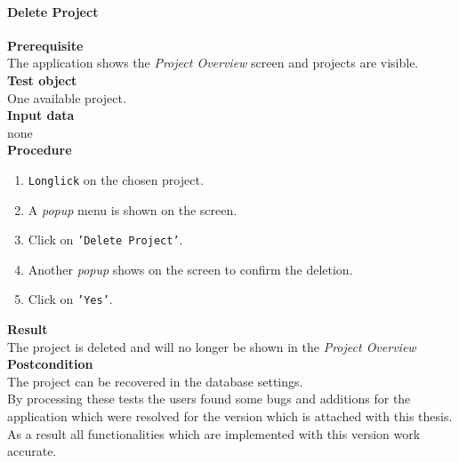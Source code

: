 \paragraph*{\textbf{Delete Project}}
\textbf{Prerequisite}\\
The application shows the \textit{Project Overview} screen and projects are visible.\\
\textbf{Test object}\\
One available project.\\
\textbf{Input data}\\
none\\
\textbf{Procedure}
\begin{enumerate}
	\item \texttt{Longlick} on the chosen project.
	\item A \textit{popup} menu is shown on the screen.
	\item Click on \texttt{'Delete Project'}.
	\item Another \textit{popup} shows on the screen to confirm the deletion.
	\item Click on \texttt{'Yes'}.
\end{enumerate}
\textbf{Result}\\
The project is deleted and will no longer be shown in the \textit{Project Overview}\\
\textbf{Postcondition}\\
The project can be recovered in the database settings.\\
By processing these tests the users found some bugs and additions for the application which were resolved for the version which is attached with this thesis. As a result all functionalities which are implemented with this version work accurate.